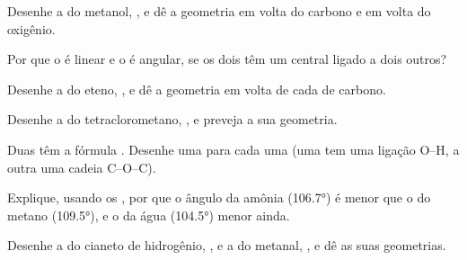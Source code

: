 \begin{exercise}[$\star\star$]\label{exo:g10:lewis-and-shape:8}
Desenhe a  do metanol, , e dê a geometria
em volta do carbono e em volta do oxigênio.
\end{exercise}

\begin{exercise}[$\star\star$]\label{exo:g10:lewis-and-shape:9}
Por que o  é linear e o  é angular, se os dois têm um
 central ligado a dois outros?
\end{exercise}

\begin{exercise}[$\star\star$]\label{exo:g10:lewis-and-shape:10}
Desenhe a  do eteno, , e dê a geometria em
volta de cada  de carbono.
\end{exercise}

\begin{exercise}[$\star\star$]\label{exo:g10:lewis-and-shape:11}
Desenhe a  do tetraclorometano, , e preveja a
sua geometria.
\end{exercise}

\begin{exercise}[$\star\star\star$]\label{exo:g10:lewis-and-shape:12}
Duas  têm a fórmula . Desenhe uma 
para cada uma (uma tem uma ligação O--H, a outra uma cadeia C--O--C).
\end{exercise}

\begin{exercise}[$\star\star\star$]\label{exo:g10:lewis-and-shape:13}
Explique, usando os , por que o ângulo da amônia
(\ang{106.7}) é menor que o do metano (\ang{109.5}), e o da água
(\ang{104.5}) menor ainda.
\end{exercise}

\begin{exercise}[$\star\star\star$]\label{exo:g10:lewis-and-shape:14}
Desenhe a  do cianeto de hidrogênio, , e a do
metanal, , e dê as suas geometrias.
\end{exercise}


